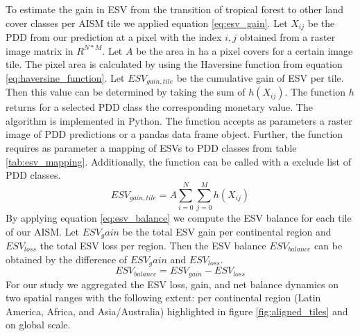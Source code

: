 		To estimate the gain in \ac{ESV} from the transition of tropical forest to other land cover classes per \ac{AISM} tile we applied equation \ref{eq:esv_gain}. Let $X_{ij}$ be the \ac{PDD} from our prediction at a pixel with the index $i,j$ obtained from a raster image matrix in $R^{N*M}$. Let $A$ be the area in ha a pixel covers for a certain image tile. The pixel area is calculated by using the Haversine function from equation \ref{eq:haversine_function}. Let $ESV_{gain,tile}$ be the cumulative gain of \ac{ESV} per tile. Then this value can be determined by taking the sum of $h(X_{ij})$. The function $h$ returns for a selected \ac{PDD} class the corresponding monetary value. The algorithm is implemented in Python. The function accepts as parameters a raster image of \ac{PDD} predictions or a pandas data frame object. Further, the function requires as parameter a mapping of \acp{ESV} to \ac{PDD} classes from table \ref{tab:esv_mapping}. Additionally, the function can be called with a exclude list of \ac{PDD} classes.
		\begin{equation}
		\label{eq:esv_gain}
			ESV_{gain,tile} = A\displaystyle\sum_{i=0}^{N}\displaystyle\sum_{j=0}^{M} h(X_{ij})
		\end{equation}
		By applying equation \ref{eq:esv_balance} we compute the \ac{ESV} balance for each tile of our \ac{AISM}. Let $ESV_gain$ be the total \ac{ESV} gain per continental region and $ESV_{loss}$ the total \ac{ESV} loss per region. Then the \ac{ESV} balance $ESV_{balance}$ can be obtained by the difference of $ESV_gain$ and $ESV_{loss}$.
		\begin{equation}
		\label{eq:esv_balance}
			ESV_{balance} = ESV_{gain} - ESV_{loss}
		\end{equation}
		For our study we aggregated the \ac{ESV} loss, gain, and net balance dynamics on two spatial ranges with the following extent: per continental region (Latin America, Africa, and Asia/Australia) highlighted in figure \ref{fig:aligned_tiles} and on global scale.


